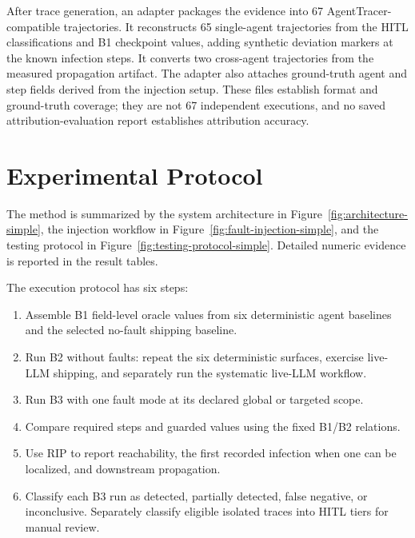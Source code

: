 \documentclass[sigconf,review,anonymous,balance=false]{acmart}
\begin{document}
After trace generation, an adapter packages the evidence into 67
AgentTracer-compatible trajectories. It reconstructs 65 single-agent
trajectories from the HITL classifications and B1 checkpoint values, adding
synthetic deviation markers at the known infection steps. It converts two
cross-agent trajectories from the measured propagation artifact. The adapter
also attaches ground-truth agent and step fields derived from the injection
setup. These files establish format and ground-truth coverage; they are not 67
independent executions, and no saved attribution-evaluation report establishes
attribution accuracy.

\section{Experimental Protocol}
\label{sec:protocol-diagrams}

The method is summarized by the system architecture in
Figure~\ref{fig:architecture-simple}, the injection workflow in
Figure~\ref{fig:fault-injection-simple}, and the testing protocol in
Figure~\ref{fig:testing-protocol-simple}. Detailed numeric evidence is reported
in the result tables.


The execution protocol has six steps:

\begin{enumerate}
  \item Assemble B1 field-level oracle values from six deterministic agent
        baselines and the selected no-fault shipping baseline.
  \item Run B2 without faults: repeat the six deterministic surfaces, exercise
        live-LLM shipping, and separately run the systematic live-LLM workflow.
  \item Run B3 with one fault mode at its declared global or targeted scope.
  \item Compare required steps and guarded values using the fixed B1/B2
        relations.
  \item Use RIP to report reachability, the first recorded infection when one
        can be localized, and downstream propagation.
  \item Classify each B3 run as detected, partially detected, false negative,
        or inconclusive. Separately classify eligible isolated traces into HITL
        tiers for manual review.
\end{enumerate}
\end{document}
